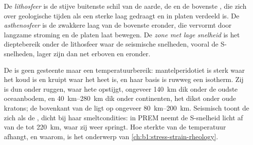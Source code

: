 \begin{definition}
\label{def:b1:layered-earth:lithosphere}
De \emph{lithosfeer} is de stijve buitenste schil van de aarde, de  en de bovenste , die zich over geologische tijden als een sterke laag
gedraagt en in platen verdeeld is. De \emph{asthenosfeer} is de zwakkere laag van de bovenste  eronder, die vervormt door langzame stroming
en de platen laat bewegen. De \emph{zone met lage snelheid} is het dieptebereik onder de lithosfeer waar de seismische snelheden, vooral de
S-snelheden, lager zijn dan net erboven en eronder.
\end{definition}

De  is geen gesteente maar een temperatuurbereik: mantelperidotiet is sterk waar het koud is en kruipt waar het heet is, en haar basis is ruwweg een
isotherm. Zij is dun onder ruggen, waar hete  opstijgt, ongeveer \qty{140}{km} dik onder de oudste oceaanbodem, en \qtyrange{40}{280}{km} dik onder
continenten, het dikst onder oude kratons; de bovenkant van de  ligt op ongeveer \qtyrange{80}{200}{km}. Seismisch toont de  zich als de , dicht bij haar smeltcondities: in PREM neemt de S-snelheid licht af van de  tot \qty{220}{km}, waar zij weer springt. Hoe sterkte van de temperatuur
afhangt, en waarom, is het onderwerp van \cref{ch:b1:stress-strain-rheology}.

